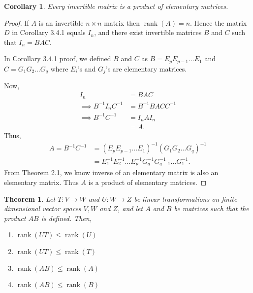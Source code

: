 \documentclass[12pt, a4paper]{article}
\newtheorem{theorem}{Theorem}[section]
\newtheorem{corollary}{Corollary}[theorem]
\theoremstyle{definition}
\theoremstyle{remark}
\DeclareMathOperator{\rank}{rank}
\begin{document}
\begin{corollary}
Every invertible matrix is a product of elementary matrices.
\end{corollary}

\begin{proof}
If $A$ is an invertible $n \times n$ matrix then $\rank(A) = n$. Hence the matrix $D$ in Corollary 3.4.1 equals $I_n$, and there exist invertible matrices $B$ and $C$ such that $I_n = BAC$.

In Corollary 3.4.1 proof, we defined $B$ and $C$ as $B = E_p E_{p-1} \dots E_1$ and $C = G_1 G_2 \dots G_q$ where $E_i$'s and $G_j$'s are elementary matrices.

Now,
\begin{align*}
I_n &= BAC \\
\implies B^{-1} I_n C^{-1} &= B^{-1} B A C C^{-1} \\
\implies B^{-1} C^{-1} &= I_n A I_n \\
&= A.
\end{align*}
Thus,
\begin{align*}
A = B^{-1} C^{-1} &= (E_p E_{p-1} \dots E_1)^{-1} (G_1 G_2 \dots G_q)^{-1} \\
&= E_1^{-1} E_2^{-1} \dots E_p^{-1} G_q^{-1} G_{q-1}^{-1} \dots G_1^{-1}.
\end{align*}
From Theorem 2.1, we know inverse of an elementary matrix is also an elementary matrix. Thus $A$ is a product of elementary matrices.
\end{proof}

\begin{theorem}
Let $T: V \to W$ and $U: W \to Z$ be linear transformations on finite-dimensional vector spaces $V, W$ and $Z$, and let $A$ and $B$ be matrices such that the product $A B$ is defined. Then,
\begin{enumerate}
    \item $\rank(UT) \le \rank(U)$
    \item $\rank(UT) \le \rank(T)$
    \item $\rank(AB) \le \rank(A)$
    \item $\rank(AB) \le \rank(B)$
\end{enumerate}
\end{theorem}
\end{document}
